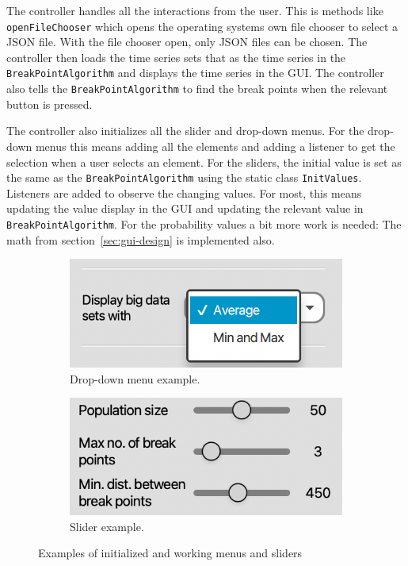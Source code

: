The controller handles all the interactions from the user. This is methods like
\texttt{openFileChooser} which opens the operating systems own file chooser to
select a JSON file. With the file chooser open, only JSON files can be chosen.
The controller then loads the time series sets that as the time series in the
\texttt{BreakPointAlgorithm} and displays the time series in the GUI. The
controller also tells the \texttt{BreakPointAlgorithm} to find the break points
when the relevant button is pressed. 

The controller also initializes all the slider and drop-down menus. For the
drop-down menus this means adding all the elements and adding a listener to get
the selection when a user selects an element. For the sliders, the initial value
is set as the same as the \texttt{BreakPointAlgorithm} using the static class
\texttt{InitValues}. Listeners are added to observe the changing values. For
most, this means updating the value display in the GUI and updating the relevant
value in \texttt{BreakPointAlgorithm}. For the probability values a bit more
work is needed: The math from section~\ref{sec:gui-design} is implemented also. 

\begin{figure}[ht]
    \centering
    \begin{subfigure}[b]{.48\textwidth}
        \centering
        \includegraphics[width=\textwidth]{fig/drop-down-menu.png}
        \caption{Drop-down menu example. }
        \label{fig:gui-drop-down}
    \end{subfigure}
    \hfill
    \begin{subfigure}[b]{.48\textwidth}
        \centering
        \includegraphics[width=\textwidth]{fig/sliders.png}
        \caption{Slider example.}
        \label{fig:gui-slider}
    \end{subfigure}
    \caption{Examples of initialized and working menus and sliders}
    \label{fig:gui-controls}
\end{figure}

